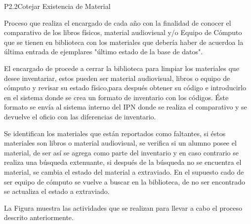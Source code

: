 
\begin{Proceso}{P2.2}{Cotejar Existencia de Material} {
  

  Proceso que realiza el  encargado de  cada año con la finalidad de conocer el comparativo de los libros físicos, material audiovisual y/o Equipo de Cómputo que se tienen en biblioteca con los materiales que debería haber de acuerdoa la última entrada de ejemplares "último estado de la base de datos".
  
  El encargado de  procede a cerrar la biblioteca para limpiar los materiales que desee inventariar, estos pueden ser material audiovisual, libros o equipo de cómputo y revisar su estado físico,para después obtener su código e introducirlo en el sistema donde se crea un formato de inventario con los códigos.  Éste formato se envía al sistema interno del IPN donde se realiza el comparativo y se devuelve el oficio con las diferencias de inventario.
  
  Se identifican los materiales que están reportados como faltantes, si éstos materiales son libros o material audiovisual, se verifica si un alumno posee el material, de ser así se agrega como parte del inventario y en caso contrario se realiza una búsqueda extenuante, si después de la búsqueda no se encuentra el material, se cambia el estado del material a extraviado.
En el supuesto cado de ser equipo de cómputo se vuelve a buscar en la biblioteca, de no ser encontrado se actualiza el estado a extraviado.
  
  \noindent La Figura  muestra las actividades que se realizan para llevar a cabo el proceso descrito anteriormente.


}
\end{Proceso}
